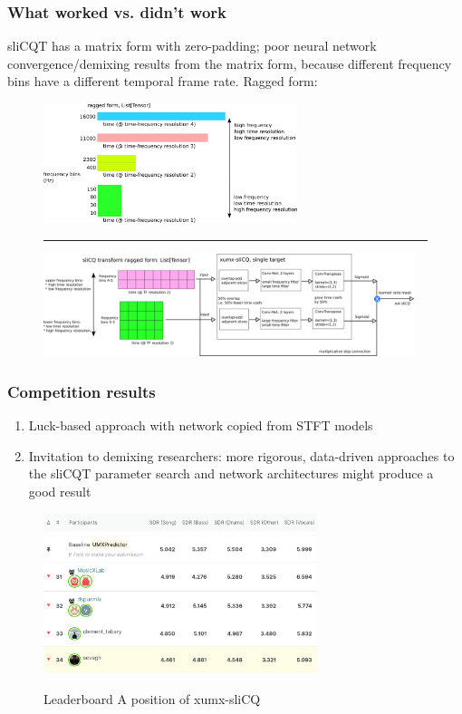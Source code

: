 \documentclass[usenames,dvipsnames]{beamer}
\begin{document}
\begin{frame}
	\frametitle{What worked vs. didn't work}
	sliCQT has a matrix form with zero-padding; poor neural network convergence/demixing results from the matrix form, because different frequency bins have a different temporal frame rate. Ragged form:
	\begin{figure}[ht]
		\centering
		\includegraphics[height=3.5cm]{./images-blockdiagrams/slicq_shape.png}\\
		\vspace{0.25em}
		\hrule
		\vspace{0.25em}
		\includegraphics[height=3cm]{./images-blockdiagrams/xumx_slicq_pertarget.png}
	\end{figure}
\end{frame}

\begin{frame}
	\frametitle{Competition results}
	\begin{enumerate}
	\item
		Luck-based approach with network copied from STFT models
	\item
		Invitation to demixing researchers: more rigorous, data-driven approaches to the sliCQT parameter search and network architectures might produce a good result
	\end{enumerate}
	\begin{figure}[ht]
		\centering
		\includegraphics[width=8cm]{./images-misc/leaderboard_header.png}\\
		\vspace{-0.25em}
		\includegraphics[width=8cm]{./images-misc/leaderboard_myplace.png}
		\caption{Leaderboard A position of xumx-sliCQ}
		\vspace{-1em}
	\end{figure}

\end{frame}
\end{document}
